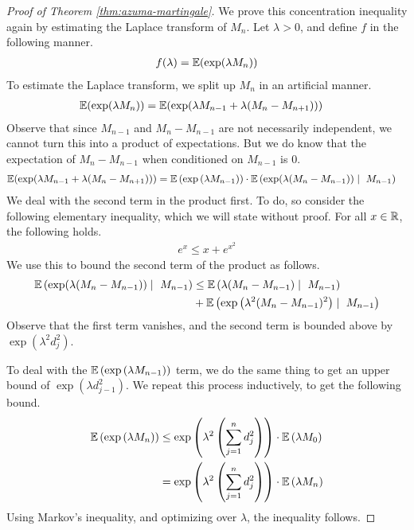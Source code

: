 \documentclass[11pt]{article}
\begin{document}
\begin{proof}[Proof of Theorem \ref{thm:azuma-martingale}]
  We prove this concentration inequality again by estimating the Laplace transform of $M_n$.
  Let $\lambda > 0$, and define $f$ in the following manner.
  \begin{align*}
    f(\lambda) = \mathbb{E}(\exp(\lambda M_n))
  \end{align*}
  To estimate the Laplace transform, we split up $M_n$ in an artificial manner.
  \begin{align*}
    \mathbb{E}(\exp(\lambda M_n))
    &= \mathbb{E}(\exp(\lambda M_{n-1} + \lambda(M_n - M_{n+1})))
  \end{align*}
  Observe that since $M_{n-1}$ and $M_n - M_{n-1}$ are not necessarily independent, we cannot turn this into a product of expectations.
  But we do know that the expectation of $M_{n} - M_{n-1}$ when conditioned on $M_{n-1}$ is $0$.
  \begin{align*}
    \mathbb{E}(\exp(\lambda M_{n-1} + \lambda(M_n - M_{n+1})))
    &= \mathbb{E}\left( \exp\left( \lambda M_{n-1} \right)  \right)
      \cdot \mathbb{E}\left( \exp(\lambda (M_n - M_{n-1})) \mid\ M_{n-1} \right)
  \end{align*}
  We deal with the second term in the product first.
  To do, so consider the following elementary inequality, which we will state without proof.
  For all $x \in \mathbb{R}$, the following holds.
  \begin{align*}
    e^x \leq x + e^{x^2}
  \end{align*}
  We use this to bound the second term of the product as follows.
  \begin{align*}
    \mathbb{E}\left( \exp(\lambda (M_n - M_{n-1})) \mid\ M_{n-1} \right)
    &\leq \mathbb{E}\left( \lambda(M_n - M_{n-1}) \mid\ M_{n-1} \right) \\
      &+ \mathbb{E}\left( \exp\left( \lambda^2(M_n - M_{n-1})^2 \right) \mid\ M_{n-1} \right)
  \end{align*}
  Observe that the first term vanishes, and the second term is bounded above by $\exp(\lambda^2 d_j^2)$.

  To deal with the $\mathbb{E}\left( \exp\left( \lambda M_{n-1} \right) \right)$ term, we do the same thing to get an upper bound of $\exp(\lambda d_{j-1}^2)$.
  We repeat this process inductively, to get the following bound.
  \begin{align*}
    \mathbb{E}\left( \exp\left( \lambda M_n \right) \right)
    &\leq \exp\left( \lambda^2 \left( \sum_{j=1}^n d_j^2 \right) \right) \cdot \mathbb{E}\left( \lambda M_0 \right) \\
    &= \exp\left( \lambda^2 \left( \sum_{j=1}^n d_j^2 \right) \right) \cdot \mathbb{E}\left( \lambda M_n \right)
  \end{align*}
  Using Markov's inequality, and optimizing over $\lambda$, the inequality follows.
\end{proof}

\printbibliography
\end{document}
